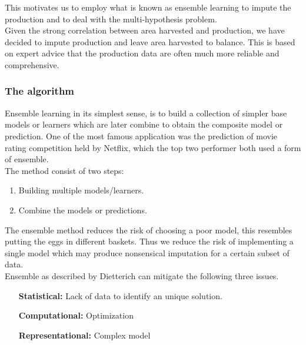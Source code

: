 \documentclass[nojss]{jss}\usepackage[]{graphicx}\usepackage[]{color}
\begin{document}
This motivates us to employ what is known as ensemble learning to
impute the production and to deal with the multi-hypothesis
problem. \\

Given the strong correlation between area harvested and production, we
have decided to impute production and leave area harvested to balance.
This is based on expert advice that the production data are often much
more reliable and comprehensive.\\


\subsubsection{The algorithm}
Ensemble learning in its simplest sense, is to build a collection of
simpler base models or learners which are later combine to obtain the
composite model or prediction. One of the most famous application was
the prediction of movie rating competition held by Netflix, which the
top two performer both used a form of ensemble. \\


The method consist of two steps:
\begin{enumerate}
  \item Building multiple models/learners.
  \item Combine the models or predictions.
\end{enumerate}


The ensemble method reduces the risk of choosing a poor model, this
resembles putting the eggs in different baskets. Thus we reduce the
risk of implementing a single model which may produce nonsensical
imputation for a certain subset of data.\\

Ensemble as described by Dietterich can mitigate the following
three issues.

\begin{itemize}
  \setlength{\itemindent}{1in}
  \item[\textbf{Statistical:}] Lack of data to identify an unique solution.
  \item[\textbf{Computational:}] Optimization
  \item[\textbf{Representational:}] Complex model
\end{itemize}
\end{document}
